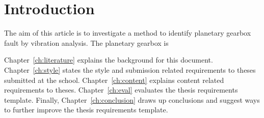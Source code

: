 \chapter{Introduction}\label{ch:intro}

The aim of this article is to investigate a method to identify planetary gearbox fault by vibration analysis. The planetary gearbox is 

Chapter~\ref{ch:literature} explains the background for this document.
Chapter~\ref{ch:style} states the style and submission related requirements
to theses submitted at the school.
Chapter~\ref{ch:content} explains content related requirements to theses.
Chapter~\ref{ch:eval} evaluates the thesis requirements template.  Finally,
Chapter~\ref{ch:conclusion} draws up conclusions and suggest ways to
further improve the thesis requirements template.

